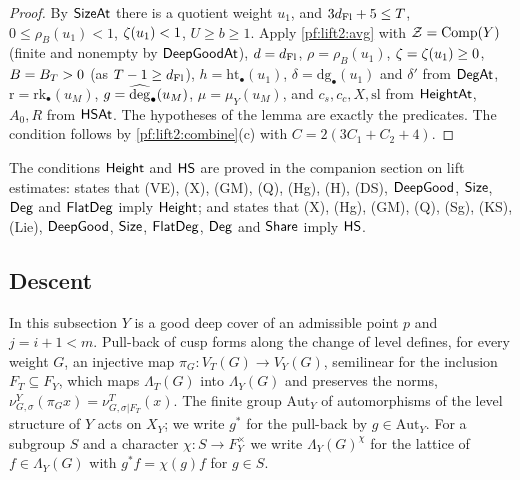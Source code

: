 \begin{proof}
By $\mathsf{SizeAt}$ there is a quotient weight $u_1$, and $3d_{\mathrm{Fl}}+5\le T$, $0\le\rho_B(u_1)<1$,
$\zeta(u_1)<1$, $U\ge b\ge1$. Apply \cref{pf:lift2:avg} with $\mathcal Z=\operatorname{Comp}(Y)$ (finite and nonempty by
$\mathsf{DeepGoodAt}$), $d=d_{\mathrm{Fl}}$, $\rho=\rho_B(u_1)$, $\zeta=\zeta(u_1)\ge0$, $B=B_T>0$ (as
$T-1\ge d_{\mathrm{Fl}}$), $h=\mathrm{ht}_\bullet(u_1)$, $\delta=\mathrm{dg}_\bullet(u_1)$ and $\delta'$ from
$\mathsf{DegAt}$, $\mathrm r=\mathrm{rk}_\bullet(u_M)$, $g=\widehat{\operatorname{deg}}_\bullet(u_M)$, $\mu=\mu_Y(u_M)$, and
$c_s,c_c,X,\mathrm{sl}$ from $\mathsf{HeightAt}$, $A_0,R$ from $\mathsf{HSAt}$. The hypotheses of the lemma are
exactly the predicates. The condition follows by \cref{pf:lift2:combine}(c) with $C=2(3C_1+C_2+4)$.
\end{proof}

The conditions $\mathsf{Height}$ and $\mathsf{HS}$ are proved in the companion section on lift estimates:
 states that \textup{(VE)}, \textup{(X)},
\textup{(GM)}, \textup{(Q)}, \textup{(Hg)}, \textup{(H)}, \textup{(DS)}, $\mathsf{DeepGood}$, $\mathsf{Size}$,
$\mathsf{Deg}$ and $\mathsf{FlatDeg}$ imply $\mathsf{Height}$; and
 states that \textup{(X)}, \textup{(Hg)},
\textup{(GM)}, \textup{(Q)}, \textup{(Sg)}, \textup{(KS)}, \textup{(Lie)}, $\mathsf{DeepGood}$, $\mathsf{Size}$,
$\mathsf{FlatDeg}$, $\mathsf{Deg}$ and $\mathsf{Share}$ imply $\mathsf{HS}$.

\subsection{Descent}\label{sec:pf:lift2:descent}

In this subsection $Y$ is a good deep cover of an admissible point $p$ and $j=i+1<m$. Pull-back of cusp forms along
the change of level defines, for every weight $G$, an injective map $\pi_G\colon V_T(G)\to V_Y(G)$, semilinear for the
inclusion $F_T\subseteq F_Y$, which maps $\Lambda_T(G)$ into $\Lambda_Y(G)$ and preserves the norms,
$\nu^Y_{G,\sigma}(\pi_Gx)=\nu^T_{G,\sigma|F_T}(x)$. The finite group $\mathrm{Aut}_Y$ of automorphisms of the level
structure of $Y$ acts on $X_Y$; we write $g^*$ for the pull-back by $g\in\mathrm{Aut}_Y$. For a subgroup $S$ and a
character $\chi\colon S\to F_Y^\times$ we write $\Lambda_Y(G)^{\chi}$ for the lattice of $f\in\Lambda_Y(G)$ with
$g^*f=\chi(g)f$ for $g\in S$.

